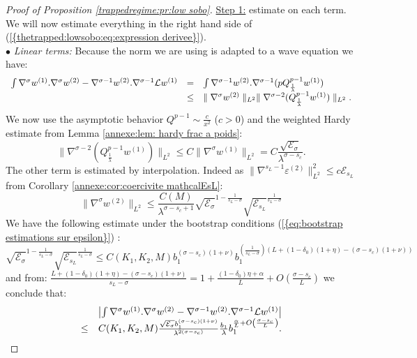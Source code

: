 \documentclass[11pt,a4paper,reqno]{amsart}
\theoremstyle{remark}
\numberwithin{equation}{section}
\begin{document}
\begin{proof}[Proof of Proposition \ref{trappedregime:pr:low sobo}]
\underline{Step 1:} estimate on each term. We will now estimate everything in the right hand side of {{\rm (\ref{{thetrapped:lowsobo:eq:expression derivee}})}}.\\
$\bullet$ \emph{Linear terms:} Because the norm we are using is adapted to a wave equation we have:
$$
\begin{array}{r c l}
\int \nabla^{\sigma}w^{(1)}.\nabla^{\sigma}w^{(2)}- \nabla^{\sigma-1}w^{(2)}.\nabla^{\sigma-1}\mathcal{L} w^{(1)}&=&\int \nabla^{\sigma-1}w^{(2)}. \nabla^{\sigma-1}(pQ_{\frac{1}{\lambda}}^{p-1}w^{(1)}) \\
&\leq & \parallel \nabla^{\sigma}w^{(2)} \parallel_{L^2} \parallel \nabla^{\sigma-2}(Q_{\frac{1}{\lambda}}^{p-1}w^{(1)}) \parallel_{L^2} .
\end{array}
$$
We now use the asymptotic behavior $Q^{p-1}\sim\frac{c}{x^{2}}$ ($c>0$) and the weighted Hardy estimate from Lemma \ref{annexe:lem: hardy frac a poids}:
$$
\parallel \nabla^{\sigma-2}(Q_{\frac{1}{\lambda}}^{p-1}w^{(1)}) \parallel_{L^2} \leq C \parallel \nabla^{\sigma} w^{(1)}\parallel_{L^2} = C \frac{\sqrt{\mathcal{E}_{\sigma}}}{\lambda^{\sigma-s_c}} .
$$
The other term is estimated by interpolation. Indeed as $\parallel \nabla^{s_L-1}\varepsilon^{(2)} \parallel_{L^2}^2\leq c\mathcal{E}_{s_L}$ from Corollary \ref{annexe:cor:coercivite mathcalEsL}:
$$
\parallel \nabla^{\sigma} w^{(2)} \parallel_{L^2}\leq \frac{C(M)}{\lambda^{\sigma-s_c+1}} \sqrt{\mathcal{E}_{\sigma}}^{1-\frac{1}{s_L-\sigma}}\sqrt{\mathcal{E}_{s_L}}^{\frac{1}{s_L-\sigma}} 
$$
We have the following estimate under the bootstrap conditions {{\rm (\ref{{eq:bootstrap estimations sur epsilon}})}} :
$$
\sqrt{\mathcal{E}_{\sigma}}^{1-\frac{1}{s_L-\sigma}}\sqrt{\mathcal{E}_{s_L}}^{\frac{1}{s_L-\sigma}} \leq C(K_1,K_2,M) b_1^{(\sigma-s_c)(1+\nu)}  b_1^{(\frac{1}{s_L-\sigma})(L+(1-\delta_0)(1+\eta)-(\sigma-s_c)(1+\nu))}
$$
and from: $\frac{L+(1-\delta_0)(1+\eta)-(\sigma-s_c)(1+\nu)}{s_L-\sigma}=1+\frac{(1-\delta_0)\eta+\alpha}{L}+O(\frac{\sigma-s_c}{L}) $ we conclude that:
\begin{equation} \label{thetrapped:lowsobo:eq:estimation lineaire}
\begin{array}{r c l}
&\left| \int \nabla^{\sigma}w^{(1)}.\nabla^{\sigma}w^{(2)}- \nabla^{\sigma-1}w^{(2)}.\nabla^{\sigma-1}\mathcal{L} w^{(1)}\right|  \\
 \leq& C(K_1,K_2,M) \frac{\sqrt{\mathcal{E}_{\sigma}}b_1^{(\sigma-s_c)(1+\nu)}}{\lambda^{2(\sigma-s_c)}}\frac{b_1}{\lambda}b_1^{\frac{\alpha}{L}+O\left(\frac{\sigma-s_c}{L} \right)} .
\end{array}

\end{equation}
\end{proof}
\end{document}
